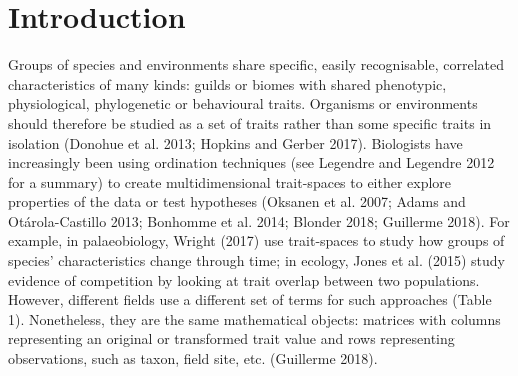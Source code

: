 \documentclass[]{article}
\begin{document}
\section{Introduction}\label{introduction}

Groups of species and environments share specific, easily recognisable,
correlated characteristics of many kinds: guilds or biomes with shared
phenotypic, physiological, phylogenetic or behavioural traits. Organisms
or environments should therefore be studied as a set of traits rather
than some specific traits in isolation (Donohue et al. 2013; Hopkins and
Gerber 2017). Biologists have increasingly been using ordination
techniques (see Legendre and Legendre 2012 for a summary) to create
multidimensional trait-spaces to either explore properties of the data
or test hypotheses (Oksanen et al. 2007; Adams and Otárola-Castillo
2013; Bonhomme et al. 2014; Blonder 2018; Guillerme 2018). For example,
in palaeobiology, Wright (2017) use trait-spaces to study how groups of
species' characteristics change through time; in ecology, Jones et al.
(2015) study evidence of competition by looking at trait overlap between
two populations. However, different fields use a different set of terms
for such approaches (Table 1). Nonetheless, they are the same
mathematical objects: matrices with columns representing an original or
transformed trait value and rows representing observations, such as
taxon, field site, etc. (Guillerme 2018).


\renewcommand\baselinestretch{1}\selectfont
\end{document}
